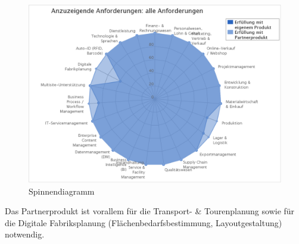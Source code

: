 \begin{figure}[H]
\begin{center}
\includegraphics[width=15cm]{images/chart.png}
\caption{Spinnendiagramm}
\end{center}
\end{figure}
\noindent
Das Partnerprodukt ist vorallem für die Transport- \& Tourenplanung sowie für die Digitale Fabriksplanung (Flächenbedarfsbestimmung, Layoutgestaltung) notwendig.

